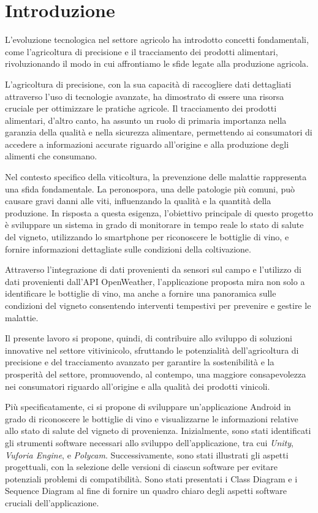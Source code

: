 {}
\chapter*{Introduzione}

L'evoluzione tecnologica nel settore agricolo ha introdotto concetti fondamentali, come l'agricoltura di precisione e il tracciamento dei prodotti alimentari, rivoluzionando il modo in cui affrontiamo le sfide legate alla produzione agricola.

L'agricoltura di precisione, con la sua capacità di raccogliere dati dettagliati attraverso l'uso di tecnologie avanzate, ha dimostrato di essere una risorsa cruciale per ottimizzare le pratiche agricole. Il tracciamento dei prodotti alimentari, d'altro canto, ha assunto un ruolo di primaria importanza nella garanzia della qualità e nella sicurezza alimentare, permettendo ai consumatori di accedere a informazioni accurate riguardo all'origine e alla produzione degli alimenti che consumano.

Nel contesto specifico della viticoltura, la prevenzione delle malattie rappresenta una sfida fondamentale. La peronospora, una delle patologie più comuni, può causare gravi danni alle viti, influenzando la qualità e la quantità della produzione. In risposta a questa esigenza, l'obiettivo principale di questo progetto è sviluppare un sistema in grado di monitorare in tempo reale lo stato di salute del vigneto, utilizzando lo smartphone per riconoscere le bottiglie di vino, e fornire informazioni dettagliate sulle condizioni della coltivazione.

Attraverso l'integrazione di dati provenienti da sensori sul campo e l'utilizzo di dati provenienti dall'API OpenWeather, l'applicazione proposta mira non solo a identificare le bottiglie di vino, ma anche a fornire una panoramica sulle condizioni del vigneto consentendo interventi tempestivi per prevenire e gestire le malattie.

Il presente lavoro si propone, quindi, di contribuire allo sviluppo di soluzioni innovative nel settore vitivinicolo, sfruttando le potenzialità dell'agricoltura di precisione e del tracciamento avanzato per garantire la sostenibilità e la prosperità del settore, promuovendo, al contempo, una maggiore consapevolezza nei consumatori riguardo all'origine e alla qualità dei prodotti vinicoli.

Più specificatamente, ci si propone di sviluppare un'applicazione Android in grado di riconoscere le bottiglie di vino e visualizzarne le informazioni relative allo stato di salute del vigneto di provenienza. Inizialmente, sono stati identificati gli strumenti software necessari allo sviluppo dell'applicazione, tra cui \textit{Unity}, \textit{Vuforia Engine}, e \textit{Polycam}. Successivamente, sono stati illustrati gli aspetti progettuali, con la selezione delle versioni di ciascun software per evitare potenziali problemi di compatibilità. Sono stati presentati i Class Diagram e i Sequence Diagram al fine di fornire un quadro chiaro degli aspetti software cruciali dell'applicazione.


